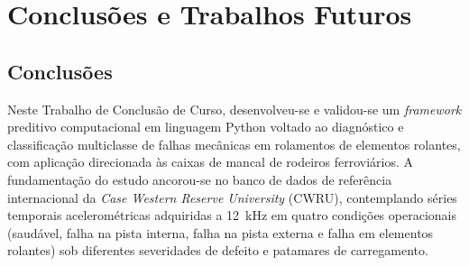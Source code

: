 \chapter{Conclusões e Trabalhos Futuros}
\label{cap:conclusao}

\section{Conclusões}
\label{sec:conclusoes}

Neste Trabalho de Conclusão de Curso, desenvolveu-se e validou-se um \textit{framework} preditivo computacional em linguagem Python voltado ao diagnóstico e classificação multiclasse de falhas mecânicas em rolamentos de elementos rolantes, com aplicação direcionada às caixas de mancal de rodeiros ferroviários. A fundamentação do estudo ancorou-se no banco de dados de referência internacional da \textit{Case Western Reserve University} (CWRU), contemplando séries temporais acelerométricas adquiridas a \SI{12}{\kilo\hertz} em quatro condições operacionais (saudável, falha na pista interna, falha na pista externa e falha em elementos rolantes) sob diferentes severidades de defeito e patamares de carregamento.

